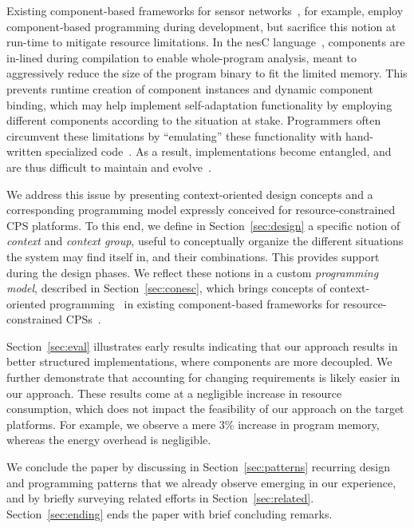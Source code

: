 Existing component-based frameworks for sensor
networks~\cite{mottola10:survey}, for example, employ component-based
programming during development, but sacrifice this notion at run-time
to mitigate resource limitations. In the nesC
language~\cite{gay03nesc}, components are in-lined during compilation
to enable whole-program analysis, meant to aggressively reduce the
size of the program binary to fit the limited memory. This prevents
runtime creation of component instances and dynamic component binding,
which may help implement self-adaptation functionality by employing
different components according to the situation at stake. Programmers
often circumvent these limitations by ``emulating'' these
functionality with hand-written specialized
code~\cite{mottola10:survey}. As a result, implementations become
entangled, and are thus difficult to maintain and
evolve~\cite{Picco:2010:SEW:1882362.1882421}.

We address this issue by presenting context-oriented design concepts
and a corresponding programming model expressly conceived for
resource-constrained CPS platforms. To this end, we define in
Section~\ref{sec:design} a specific notion of \emph{context} and
\emph{context group}, useful to conceptually organize the different
situations the system may find itself in, and their combinations. This
provides support during the design phases. We reflect these notions in
a custom \emph{programming model}, described in
Section~\ref{sec:conesc}, which brings concepts of context-oriented
programming~\cite{Hirschfeld08} in existing component-based frameworks
for resource-constrained CPSs~\cite{gay03nesc}. %

Section~\ref{sec:eval} illustrates early results indicating that our
approach results in better structured implementations, where
components are more decoupled. We further demonstrate that accounting
for changing requirements is likely easier in our approach. These
results come at a negligible increase in resource consumption, which
does not impact the feasibility of our approach on the target
platforms. For example, we observe a mere 3\% increase in program
memory, whereas the energy overhead is negligible.

We conclude the paper by discussing in Section~\ref{sec:patterns}
recurring design and programming patterns that we already observe
emerging in our experience, and by briefly surveying related efforts
in Section~\ref{sec:related}. Section~\ref{sec:ending} ends the paper
with brief concluding remarks.

